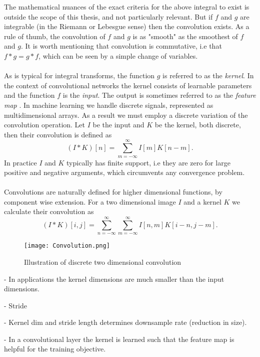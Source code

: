 \documentclass[../../thesis.tex]{subfiles}
\begin{document}
The mathematical nuances of the exact criteria for the above integral to exist is outside the scope of this thesis, and not particularly relevant. But if $f$ and $g$ are integrable (in the Riemann or Lebesgue sense) then the convolution exists. As a rule of thumb, the convolution of $f$ and $g$ is as "smooth" as the smoothest of $f$ and $g$. It is worth mentioning that convolution is commutative, i.e that $f*g = g*f$, which can be seen by a simple change of variables. 
\\\\ 
As is typical for integral transforms, the function $g$ is referred to as the \textit{kernel}. In the context of convolutional networks the kernel consists of learnable parameters and the function $f$ is the \textit{input}. The output is sometimes referred to as the \textit{feature map} \cite{deeplearningbook}. In machine learning we handle discrete signals, represented as multidimensional arrays. As a result we must employ a discrete variation of the convolution operation. Let $I$ be the input and $K$ be the kernel, both discrete, then their convolution is defined as
\begin{equation}
    (I*K)[n] = \sum_{m=-\infty}^{\infty} I[m]K[n-m].
\end{equation}
In practice $I$ and $K$ typically has finite support, i.e they are zero for large positive and negative arguments, which circumvents any convergence problem.\\\\
Convolutions are naturally defined for higher dimensional functions, by component wise extension. For a two dimensional image $I$ and a kernel $K$ we calculate their convolution as 
\begin{equation}
    (I*K)[i,j] = \sum_{n=-\infty}^{\infty}\sum_{m=-\infty}^{\infty} I[n,m]K[i - n,j - m]. 
\end{equation}

\begin{figure}[h]
    \texttt{[image: Convolution.png]}
    \centering    
    \caption{Illustration of discrete two dimensional convolution}
\end{figure}

- In applications the kernel dimensions are much smaller than the input dimensions. 

- Stride 

- Kernel dim and stride length determines downsample rate (reduction in size). 

- In a convolutional layer the kernel is learned such that the feature map is helpful for the training objective. 
\end{document}
